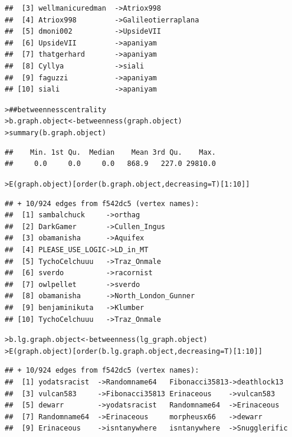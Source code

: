 \documentclass[12pt]{article}\usepackage[]{graphicx}\usepackage[]{color}
\makeatletter
\newcommand{\hlnum}[1]{\textcolor[rgb]{0.82,0.78,0.62}{#1}}%
\newcommand{\hlcom}[1]{\textcolor[rgb]{0.404,0.408,0.42}{#1}}%
\newcommand{\hlopt}[1]{\textcolor[rgb]{0.882,0.878,0.898}{#1}}%
\newcommand{\hlstd}[1]{\textcolor[rgb]{0.882,0.878,0.898}{#1}}%
\newcommand{\hlkwb}[1]{\textcolor[rgb]{0.902,0.675,0.196}{#1}}%
\newcommand{\hlkwc}[1]{\textcolor[rgb]{0.812,0.522,0.388}{#1}}%
\newcommand{\hlkwd}[1]{\textcolor[rgb]{0.733,0.388,0.812}{#1}}%
\newenvironment{kframe}{%
 \def\at@end@of@kframe{}%
 \ifinner\ifhmode%
  \def\at@end@of@kframe{\end{minipage}}%
  \begin{minipage}{\columnwidth}%
 \fi\fi%
 \def\FrameCommand##1{\hskip\@totalleftmargin \hskip-\fboxsep
 \colorbox{shadecolor}{##1}\hskip-\fboxsep
     \hskip-\linewidth \hskip-\@totalleftmargin \hskip\columnwidth}%
 \MakeFramed {\advance\hsize-\width
   \@totalleftmargin\z@ \linewidth\hsize
   \@setminipage}}%
 {\par\unskip\endMakeFramed%
 \at@end@of@kframe}
\newenvironment{knitrout}{}{} %
\makeatother
\begin{document}
\begin{flushleft}
\begin{knitrout}
\begin{kframe}
\begin{verbatim}
##  [3] wellmanicuredman  ->Atriox998         
##  [4] Atriox998         ->Galileotierraplana
##  [5] dmoni002          ->UpsideVII         
##  [6] UpsideVII         ->apaniyam          
##  [7] thatgerhard       ->apaniyam          
##  [8] Cyllya            ->siali             
##  [9] faguzzi           ->apaniyam          
## [10] siali             ->apaniyam
\end{verbatim}
\begin{alltt}
\hlstd{> }\hlcom{## betweenness centrality}
\hlstd{> }\hlstd{b.graph.object} \hlkwb{<-} \hlkwd{betweenness}\hlstd{(graph.object)}
\hlstd{> }\hlkwd{summary}\hlstd{(b.graph.object)}
\end{alltt}
\begin{verbatim}
##    Min. 1st Qu.  Median    Mean 3rd Qu.    Max. 
##     0.0     0.0     0.0   868.9   227.0 29810.0
\end{verbatim}
\begin{alltt}
\hlstd{> }\hlkwd{E}\hlstd{(graph.object)[}\hlkwd{order}\hlstd{(b.graph.object,} \hlkwc{decreasing}\hlstd{=T)[}\hlnum{1}\hlopt{:}\hlnum{10}\hlstd{]]}
\end{alltt}
\begin{verbatim}
## + 10/924 edges from f542dc5 (vertex names):
##  [1] sambalchuck     ->orthag             
##  [2] DarkGamer       ->Cullen_Ingus       
##  [3] obamanisha      ->Aquifex            
##  [4] PLEASE_USE_LOGIC->LD_in_MT           
##  [5] TychoCelchuuu   ->Traz_Onmale        
##  [6] sverdo          ->racornist          
##  [7] owlpellet       ->sverdo             
##  [8] obamanisha      ->North_London_Gunner
##  [9] benjaminikuta   ->Klumber            
## [10] TychoCelchuuu   ->Traz_Onmale
\end{verbatim}
\begin{alltt}
\hlstd{> }\hlstd{b.lg.graph.object} \hlkwb{<-} \hlkwd{betweenness}\hlstd{(lg_graph.object)}
\hlstd{> }\hlkwd{E}\hlstd{(graph.object)[}\hlkwd{order}\hlstd{(b.lg.graph.object,} \hlkwc{decreasing}\hlstd{=T)[}\hlnum{1}\hlopt{:}\hlnum{10}\hlstd{]]}
\end{alltt}
\begin{verbatim}
## + 10/924 edges from f542dc5 (vertex names):
##  [1] yodatsracist  ->Randomname64   Fibonacci35813->deathlock13   
##  [3] vulcan583     ->Fibonacci35813 Erinaceous    ->vulcan583     
##  [5] dewarr        ->yodatsracist   Randomname64  ->Erinaceous    
##  [7] Randomname64  ->Erinaceous     morpheusx66   ->dewarr        
##  [9] Erinaceous    ->isntanywhere   isntanywhere  ->Snugglerific
\end{verbatim}

\end{kframe}
\end{knitrout}
\end{flushleft}
\end{document}
